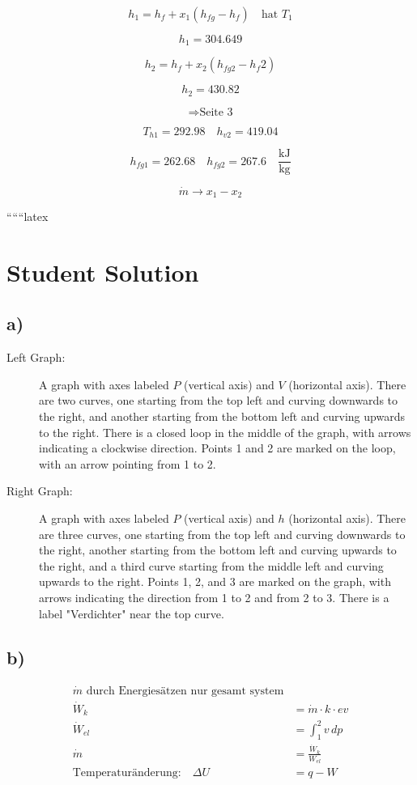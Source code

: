 \[
h_1 = h_f + x_1 (h_{fg} - h_f) \quad \text{hat } T_1
\]

\[
h_1 = 304.649
\]

\[
h_2 = h_f + x_2 (h_{fg2} - h_f2)
\]

\[
h_2 = 430.82
\]

\[
\Rightarrow \text{Seite 3}
\]

\[
T_{h1} = 292.98 \quad h_{v2} = 419.04
\]

\[
h_{fg1} = 262.68 \quad h_{fg2} = 267.6 \quad \frac{\text{kJ}}{\text{kg}}
\]

\[
\dot{m} \rightarrow x_1 - x_2
\]

``````latex


\section*{Student Solution}

\subsection*{a)}

\begin{description}
    \item[Left Graph:] A graph with axes labeled $P$ (vertical axis) and $V$ (horizontal axis). There are two curves, one starting from the top left and curving downwards to the right, and another starting from the bottom left and curving upwards to the right. There is a closed loop in the middle of the graph, with arrows indicating a clockwise direction. Points 1 and 2 are marked on the loop, with an arrow pointing from 1 to 2.
    \item[Right Graph:] A graph with axes labeled $P$ (vertical axis) and $h$ (horizontal axis). There are three curves, one starting from the top left and curving downwards to the right, another starting from the bottom left and curving upwards to the right, and a third curve starting from the middle left and curving upwards to the right. Points 1, 2, and 3 are marked on the graph, with arrows indicating the direction from 1 to 2 and from 2 to 3. There is a label "Verdichter" near the top curve.
\end{description}

\subsection*{b)}

\begin{align*}
\dot{m} \text{ durch Energiesätzen nur gesamt system} \\
\dot{W}_k &= \dot{m} \cdot k \cdot ev \\
\dot{W}_{el} &= \int_{1}^{2} v \, dp \\
\dot{m} &= \frac{\dot{W}_k}{W_{el}} \\
\text{Temperaturänderung:} \quad \Delta U &= q - W
\end{align*}

